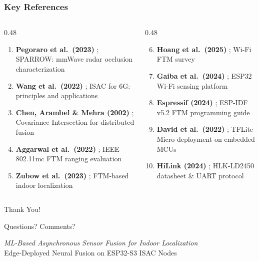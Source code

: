 \documentclass[
	11pt,
	aspectratio=169,
]{beamer}
\begin{document}
\begin{frame}
	\frametitle{Key References}

	\scriptsize
	\begin{columns}[t]
		\begin{column}{0.48\textwidth}
			\begin{enumerate}
				\item \textbf{Pegoraro et al.\ (2023)} ; SPARROW: mmWave radar occlusion characterization
				\item \textbf{Wang et al.\ (2022)} ; ISAC for 6G: principles and applications
				\item \textbf{Chen, Arambel \& Mehra (2002)} ; Covariance Intersection for distributed fusion
				\item \textbf{Aggarwal et al.\ (2022)} ; IEEE 802.11mc FTM ranging evaluation
				\item \textbf{Zubow et al.\ (2023)} ; FTM-based indoor localization
			\end{enumerate}
		\end{column}
		\begin{column}{0.48\textwidth}
			\begin{enumerate}
				\setcounter{enumi}{5}
				\item \textbf{Hoang et al.\ (2025)} ; Wi-Fi FTM survey
				\item \textbf{Gaiba et al.\ (2024)} ; ESP32 Wi-Fi sensing platform
				\item \textbf{Espressif (2024)} ; ESP-IDF v5.2 FTM programming guide
				\item \textbf{David et al.\ (2022)} ; TFLite Micro deployment on embedded MCUs
				\item \textbf{HiLink (2024)} ; HLK-LD2450 datasheet \& UART protocol
			\end{enumerate}
		\end{column}
	\end{columns}
\end{frame}


\begin{frame}[plain]
	\begin{center}
		{\Huge Thank You!}

		\bigskip\bigskip

		{\LARGE Questions? Comments?}

		\vfill
		\small \textit{ML-Based Asynchronous Sensor Fusion for Indoor Localization} \\
		\small Edge-Deployed Neural Fusion on ESP32-S3 ISAC Nodes
	\end{center}
\end{frame}

\end{document}

